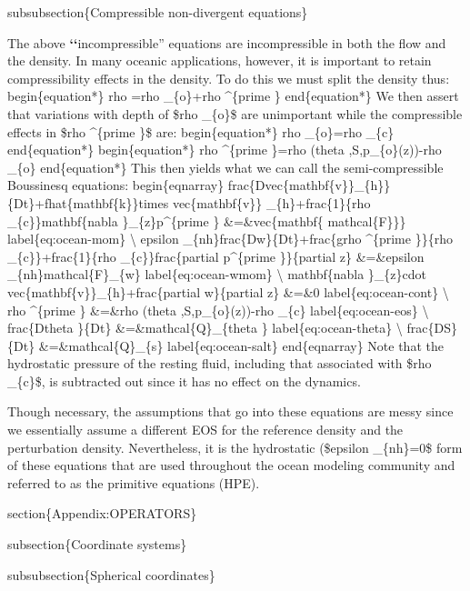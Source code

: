 \documentclass[letterpaper,10pt,english]{sphinxmanual}
\begin{document}
subsubsection\{Compressible non-divergent equations\}

The above {\color{red}\bfseries{}{}`{}`}incompressible'' equations are incompressible in both the flow
and the density. In many oceanic applications, however, it is important to
retain compressibility effects in the density. To do this we must split the
density thus:
begin\{equation*\}
rho =rho \_\{o\}+rho \textasciicircum{}\{prime \}
end\{equation*\}
We then assert that variations with depth of \$rho \_\{o\}\$ are unimportant
while the compressible effects in \$rho \textasciicircum{}\{prime \}\$ are:
begin\{equation*\}
rho \_\{o\}=rho \_\{c\}
end\{equation*\}
begin\{equation*\}
rho \textasciicircum{}\{prime \}=rho (theta ,S,p\_\{o\}(z))-rho \_\{o\}
end\{equation*\}
This then yields what we can call the semi-compressible Boussinesq
equations:
begin\{eqnarray\}
frac\{Dvec\{mathbf\{v\}\}\_\{h\}\}\{Dt\}+fhat\{mathbf\{k\}\}times vec\{mathbf\{v\}\}
\_\{h\}+frac\{1\}\{rho \_\{c\}\}mathbf\{nabla \}\_\{z\}p\textasciicircum{}\{prime \} \&=\&vec\{mathbf\{
mathcal\{F\}\}\}  label\{eq:ocean-mom\} \textbackslash{}
epsilon \_\{nh\}frac\{Dw\}\{Dt\}+frac\{grho \textasciicircum{}\{prime \}\}\{rho \_\{c\}\}+frac\{1\}\{rho
\_\{c\}\}frac\{partial p\textasciicircum{}\{prime \}\}\{partial z\} \&=\&epsilon \_\{nh\}mathcal\{F\}\_\{w\}
label\{eq:ocean-wmom\} \textbackslash{}
mathbf\{nabla \}\_\{z\}cdot vec\{mathbf\{v\}\}\_\{h\}+frac\{partial w\}\{partial z\}
\&=\&0  label\{eq:ocean-cont\} \textbackslash{}
rho \textasciicircum{}\{prime \} \&=\&rho (theta ,S,p\_\{o\}(z))-rho \_\{c\}  label\{eq:ocean-eos\}
\textbackslash{}
frac\{Dtheta \}\{Dt\} \&=\&mathcal\{Q\}\_\{theta \}  label\{eq:ocean-theta\} \textbackslash{}
frac\{DS\}\{Dt\} \&=\&mathcal\{Q\}\_\{s\}  label\{eq:ocean-salt\}
end\{eqnarray\}
Note that the hydrostatic pressure of the resting fluid, including that
associated with \$rho \_\{c\}\$, is subtracted out since it has no effect on the
dynamics.

Though necessary, the assumptions that go into these equations are messy
since we essentially assume a different EOS for the reference density and
the perturbation density. Nevertheless, it is the hydrostatic (\$epsilon
\_\{nh\}=0\$ form of these equations that are used throughout the ocean modeling
community and referred to as the primitive equations (HPE).

section\{Appendix:OPERATORS\}

subsection\{Coordinate systems\}

subsubsection\{Spherical coordinates\}
\end{document}
